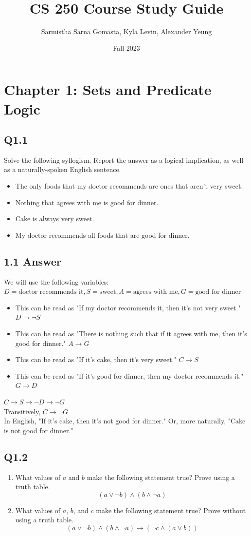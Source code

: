 \documentclass{article}
\title{CS 250 Course Study Guide}
\author{Sarmistha Sarna Gomasta, Kyla Levin, Alexander Yeung}
\date{Fall 2023}
\begin{document}
\maketitle

\section*{Chapter 1: Sets and Predicate Logic}
\subsection*{Q1.1}
Solve the following syllogism. Report the answer as a logical implication, as well as a naturally-spoken English sentence.
\begin{itemize}
    \item The only foods that my doctor recommends are ones that aren't very sweet.
    \item Nothing that agrees with me is good for dinner.
    \item Cake is always very sweet.
    \item My doctor recommends all foods that are good for dinner.
\end{itemize}
\newpage
\subsection*{1.1 Answer}
We will use the following variables: $D=\text{doctor recommends it},S=\text{sweet},A=\text{agrees with me},G=\text{good for dinner}$
\begin{itemize}
    \item This can be read as "If my doctor recommends it, then it's not very sweet." $D\rightarrow \neg S$
    \item This can be read as "There is nothing such that if it agrees with me, then it's good for dinner." $A\rightarrow G$
    \item This can be read as "If it's cake, then it's very sweet." $C\rightarrow S$
    \item This can be read as "If it's good for dinner, then my doctor recommends it." $G\rightarrow D$
\end{itemize}
$C\rightarrow S\rightarrow \neg D\rightarrow\neg G$
\\ Transitively, $C\rightarrow\neg G$
\\ In English, "If it's cake, then it's not good for dinner." Or, more naturally, "Cake is not good for dinner."
\newpage
\subsection*{Q1.2}
\begin{enumerate}[label=\alph*.]
    \item What values of $a$ and $b$ make the following statement true? Prove using a truth table.
    $$(a \lor \neg b) \land (b \land \neg a)$$
    \item What values of $a$, $b$, and $c$ make the following statement true? Prove without using a truth table.
    $$(a \lor \neg b) \land (b \land \neg a)\rightarrow (\neg c\land(a \lor b))$$
\end{enumerate}
\newpage
\end{document}
